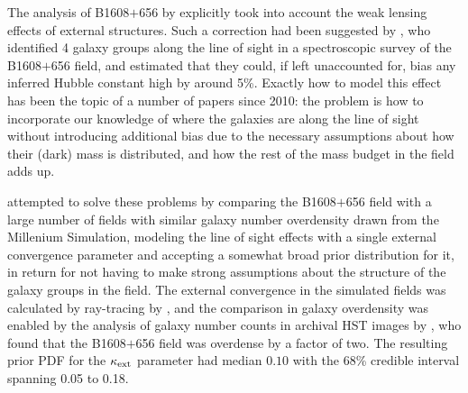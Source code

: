 

The analysis of B1608$+$656 by \citet{Suy++10} explicitly took into
account the weak lensing effects of external structures.  Such a
correction had been suggested by \citet{Fas++06b}, who identified 4
galaxy groups along the line of sight in a spectroscopic survey of the
B1608$+$656 field, and estimated that they could, if left unaccounted
for, bias any inferred Hubble constant high by around 5\%. Exactly how
to  model this effect has been the topic of a number of papers since
2010: the problem is  how to incorporate our knowledge of where the
galaxies are along the line of sight without introducing additional
bias due to the necessary assumptions about how their (dark) mass is
distributed, and how the rest of the mass budget in the field adds up.

\citet{Suy++10} attempted to solve these problems by comparing the
B1608$+$656 field with a large number of fields with similar  galaxy
number overdensity drawn from the Millenium Simulation, modeling the
line of sight effects with a single external convergence parameter and
accepting a somewhat broad prior distribution for it, in return for not
having to make  strong assumptions about the structure of the galaxy
groups in the field. The external convergence in the simulated fields
was calculated by ray-tracing by \citet{Hil++09}, and the
comparison in galaxy overdensity was enabled by the analysis of galaxy
number counts in archival HST images by \citet{FKW11}, who found that
the B1608$+$656 field was overdense by a factor of two. The resulting
prior PDF for the $\kappa_{\rm ext}$ parameter had median $0.10$ with
the 68\% credible interval spanning 0.05 to 0.18.
